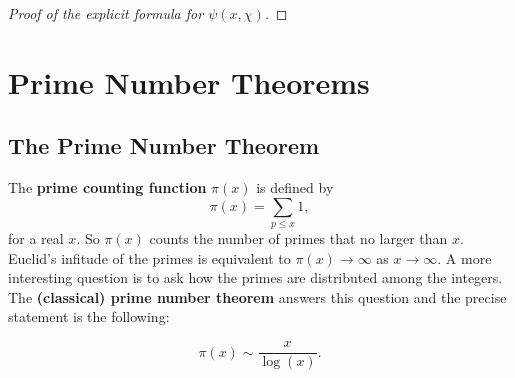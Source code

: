       \begin{proof}[Proof of the explicit formula for $\psi(x,\chi)$]
      \end{proof}
  \section{Prime Number Theorems}
    \subsection*{The Prime Number Theorem}
      The \textbf{prime counting function} $\pi(x)$ is defined by
      \[
        \pi(x) = \sum_{p \le x}1,
      \]
      for a real $x$. So $\pi(x)$ counts the number of primes that no larger than $x$. Euclid's infitude of the primes is equivalent to $\pi(x) \to \infty$ as $x \to \infty$. A more interesting question is to ask how the primes are distributed among the integers. The \textbf{(classical) prime number theorem} answers this question and the precise statement is the following:

      \begin{theorem}
        \phantom{ }
        \[
          \pi(x) \sim \frac{x}{\log(x)}.
        \]
      \end{theorem}

